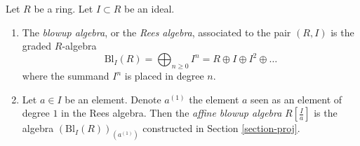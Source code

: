 \begin{definition}
\label{definition-blow-up}
Let $R$ be a ring.
Let $I \subset R$ be an ideal.
\begin{enumerate}
\item The {\it blowup algebra}, or the {\it Rees algebra}, associated to
the pair $(R, I)$ is the graded $R$-algebra
$$
\text{Bl}_I(R) =
\bigoplus\nolimits_{n \geq 0} I^n =
R \oplus I \oplus I^2 \oplus \ldots
$$
where the summand $I^n$ is placed in degree $n$.
\item Let $a \in I$ be an element. Denote $a^{(1)}$ the element $a$
seen as an element of degree $1$ in the Rees algebra. Then the
{\it affine blowup algebra} $R[\frac{I}{a}]$ is the algebra
$(\text{Bl}_I(R))_{(a^{(1)})}$ constructed in Section \ref{section-proj}.
\end{enumerate}
\end{definition}